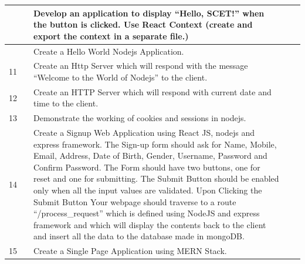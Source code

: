 \documentclass[a4paper,12pt]{article}
\begin{document}
\begin{longtable}{|>{\centering\arraybackslash}p{1cm}|>{\centering\arraybackslash}p{2cm}|p{8.5cm}|>{\centering\arraybackslash}p{1.2cm}|>{\centering\arraybackslash}p{2cm}|}
9 & & Develop an application to display ``Hello, SCET!'' when the button is clicked. Use React Context (create and export the context in a separate file.) & & \\[30pt]
\hline

10 & & Create a Hello World Nodejs Application. & & \\[40pt]
\hline

11 & & Create an Http Server which will respond with the message ``Welcome to the World of Nodejs'' to the client. & & \\[30pt]
\hline

12 & & Create an HTTP Server which will respond with current date and time to the client. & & \\[30pt]
\hline

13 & & Demonstrate the working of cookies and sessions in nodejs. & & \\[40pt]
\hline

14 & & Create a Signup Web Application using React JS, nodejs and express framework. The Sign-up form should ask for Name, Mobile, Email, Address, Date of Birth, Gender, Username, Password and Confirm Password. The Form should have two buttons, one for reset and one for submitting. The Submit Button should be enabled only when all the input values are validated. Upon Clicking the Submit Button Your webpage should traverse to a route ``/process\_request'' which is defined using NodeJS and express framework and which will display the contents back to the client and insert all the data to the database made in mongoDB. & & \\[6pt]
\hline

15 & & Create a Single Page Application using MERN Stack. & & \\[40pt]
\hline

\end{longtable}
\end{document}
